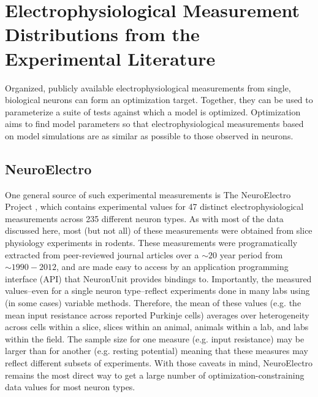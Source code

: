 \section{Electrophysiological Measurement Distributions from the Experimental Literature}\label{sec:data-sources}
Organized, publicly available electrophysiological measurements from single, biological neurons can form an optimization target.
Together, they can be used to parameterize a suite of tests against which a model is optimized.
Optimization aims to find model parameters so that electrophysiological measurements based on model simulations are as similar as possible to those observed in neurons.

\subsection{NeuroElectro}
\label{sec:neuroelectro}
One general source of such experimental measurements is The NeuroElectro Project \citep{tripathy2014neuroelectro}, which contains experimental values for 47 distinct electrophysiological measurements across 235 different neuron types.
As with most of the data discussed here, most (but not all) of these measurements were obtained from slice physiology experiments in rodents.
These measurements were programatically extracted from peer-reviewed journal articles over a $\sim20$ year period from $\sim1990-2012$,
and are made easy to access by an application programming interface (API) that NeuronUnit provides bindings to.
Importantly, the measured values--even for a single neuron type--reflect experiments done in many labs using (in some cases) variable methods.
Therefore, the mean of these values (e.g. the mean input resistance across reported Purkinje cells) averages over heterogeneity across cells within a slice, slices within an animal, animals within a lab, and labs within the field.
The sample size for one measure (e.g. input resistance) may be larger than for another (e.g. resting potential) meaning that these measures may reflect different subsets of experiments.
With those caveats in mind, NeuroElectro remains the most direct way to get a large number of optimization-constraining data values for most neuron types.

